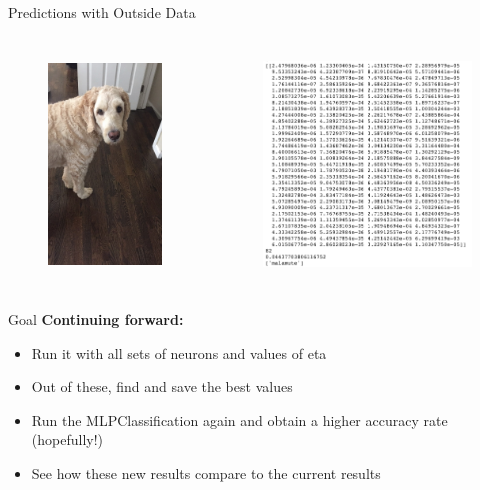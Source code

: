 \documentclass[leqno]{beamer}
\begin{document}
\begin{frame}{Predictions with Outside Data}
    \begin{columns}
        \begin{column}{0.45\textwidth}
            \begin{figure}
                \includegraphics[height=6cm]{max2.jpg}
            \end{figure}
        \end{column}
        \begin{column}{0.45\textwidth}
            \begin{figure}
                \includegraphics[height=6cm]{malamute.jpg}
            \end{figure}
        \end{column}
    \end{columns}
\end{frame}

\begin{frame}{Goal}
    \textbf{Continuing forward:}
    \begin{itemize}
        \item Run it with all sets of neurons and values of eta
        \item Out of these, find and save the best values
        \item Run the MLPClassification again and obtain a higher accuracy 
        rate (hopefully!)
        \item See how these new results compare to the current results
    \end{itemize}
\end{frame}
\end{document}
